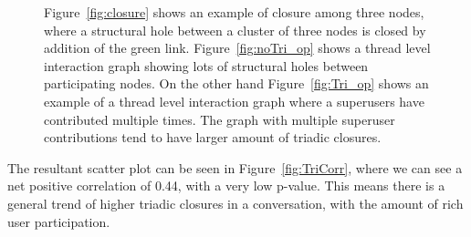 \begin{figure}[!ht]
    \centering

    \caption{ Figure~\ref{fig:closure} shows an example of closure among three nodes, where a structural hole between a cluster of three nodes is closed by addition of the green link. Figure~\ref{fig:noTri_op} shows a thread level interaction graph showing lots of structural holes between participating nodes. On the other hand Figure~\ref{fig:Tri_op} shows an example of a thread level interaction graph where a superusers have contributed multiple times. The graph with multiple superuser contributions tend to have larger amount of triadic closures. }
\end{figure}

The resultant scatter plot can be seen in Figure~\ref{fig:TriCorr}, where we can see a net positive correlation of 0.44, with a very low p-value. This means there is a general trend of higher triadic closures in a conversation, with the amount of rich user participation.
 
